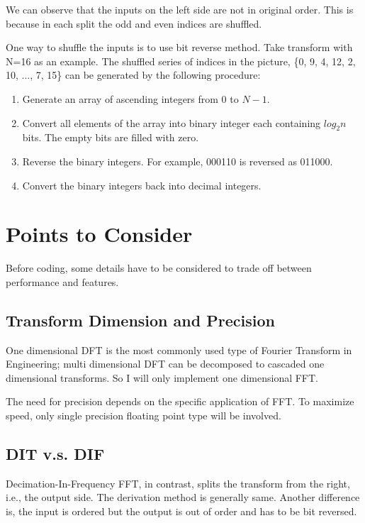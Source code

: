 \documentclass[a4paper]{report}
\begin{document}
	We can observe that the inputs on the left side are not in original order. This is because in each split the odd and even indices are shuffled.
	
	One way to shuffle the inputs is to use bit reverse method. Take transform with N=16 as an example. The shuffled series of indices in the picture, \{0, 9, 4, 12, 2, 10, ..., 7, 15\} can be generated by the following procedure:
	
	\begin{enumerate}
		\item Generate an array of ascending integers from 0 to $N-1$.
		\item Convert all elements of the array into binary integer each containing $log_2n$ bits. The empty bits are filled with zero.
		\item Reverse the binary integers. For example, 000110 is reversed as 011000.
		\item Convert the binary integers back into decimal integers.
	\end{enumerate}

\section{Points to Consider} \indent

	Before coding, some details have to be considered to trade off between performance and features.

\subsection{Transform Dimension and Precision} \indent

	One dimensional DFT is the most commonly used type of Fourier Transform in Engineering; multi dimensional DFT can be decomposed to cascaded one dimensional transforms. So I will only implement one dimensional FFT.
	
	The need for precision depends on the specific application of FFT. To maximize speed, only single precision floating point type will be involved.

\subsection{DIT v.s. DIF} \indent

	Decimation-In-Frequency FFT, in contrast, splits the transform from the right, i.e., the output side. The derivation method is generally same. Another difference is, the input is ordered but the output is out of order and has to be bit reversed.
	
\end{document}
